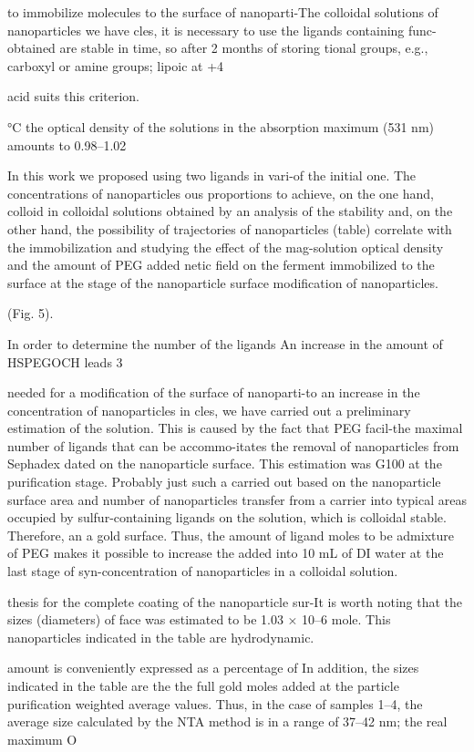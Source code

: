 \documentclass[12pt,a4paper]{article}
\begin{document}
to immobilize molecules to the surface of nanoparti-The colloidal
solutions of nanoparticles we have cles, it is necessary to use the
ligands containing func-obtained are stable in time, so after 2 months
of storing tional groups, e.g., carboxyl or amine groups; lipoic at +4

acid suits this criterion.

°C the optical density of the solutions in the absorption maximum (531
nm) amounts to 0.98--1.02

In this work we proposed using two ligands in vari-of the initial one.
The concentrations of nanoparticles ous proportions to achieve, on the
one hand, colloid in colloidal solutions obtained by an analysis of the
stability and, on the other hand, the possibility of trajectories of
nanoparticles (table) correlate with the immobilization and studying the
effect of the mag-solution optical density and the amount of PEG added
netic field on the ferment immobilized to the surface at the stage of
the nanoparticle surface modification of nanoparticles.

(Fig. 5).

In order to determine the number of the ligands An increase in the
amount of HSPEGOCH leads 3

needed for a modification of the surface of nanoparti-to an increase in
the concentration of nanoparticles in cles, we have carried out a
preliminary estimation of the solution. This is caused by the fact that
PEG facil-the maximal number of ligands that can be accommo-itates the
removal of nanoparticles from Sephadex dated on the nanoparticle
surface. This estimation was G100 at the purification stage. Probably
just such a carried out based on the nanoparticle surface area and
number of nanoparticles transfer from a carrier into typical areas
occupied by sulfur-containing ligands on the solution, which is
colloidal stable. Therefore, an a gold surface. Thus, the amount of
ligand moles to be admixture of PEG makes it possible to increase the
added into 10 mL of DI water at the last stage of syn-concentration of
nanoparticles in a colloidal solution.

thesis for the complete coating of the nanoparticle sur-It is worth
noting that the sizes (diameters) of face was estimated to be 1.03 ×
10--6 mole. This nanoparticles indicated in the table are hydrodynamic.

amount is conveniently expressed as a percentage of In addition, the
sizes indicated in the table are the the full gold moles added at the
particle purification weighted average values. Thus, in the case of
samples 1--4, the average size calculated by the NTA method is in a
range of 37--42 nm; the real maximum O
\end{document}
